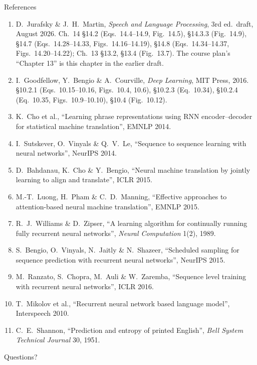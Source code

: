 \documentclass[aspectratio=169, 11pt]{beamer}
\newcommand{\nosrc}{}       %
\begin{document}
\begin{frame}[allowframebreaks]{References}
  \nosrc
  \vspace{0.3em}
  {\scriptsize
  \begin{enumerate}\itemsep0.30em
    \item D.\ Jurafsky \& J.\ H.\ Martin, \emph{Speech and Language
          Processing}, 3rd ed.\ draft, August 2026. Ch.~14 \S14.2
          (Eqs.~14.4--14.9, Fig.~14.5), \S14.3.3 (Fig.~14.9), \S14.7
          (Eqs.~14.28--14.33, Figs.~14.16--14.19), \S14.8
          (Eqs.~14.34--14.37, Figs.~14.20--14.22); Ch.~13 \S13.2, \S13.4
          (Fig.~13.7). The course plan's ``Chapter 13'' is this chapter
          in the earlier draft.
    \item I.\ Goodfellow, Y.\ Bengio \& A.\ Courville, \emph{Deep
          Learning}, MIT Press, 2016. \S10.2.1 (Eqs.~10.15--10.16,
          Figs.~10.4, 10.6), \S10.2.3 (Eq.~10.34), \S10.2.4 (Eq.~10.35,
          Figs.~10.9--10.10), \S10.4 (Fig.~10.12).
    \item K.\ Cho et al., ``Learning phrase representations using RNN
          encoder--decoder for statistical machine translation'',
          EMNLP 2014.
    \item I.\ Sutskever, O.\ Vinyals \& Q.\ V.\ Le, ``Sequence to sequence
          learning with neural networks'', NeurIPS 2014.
    \item D.\ Bahdanau, K.\ Cho \& Y.\ Bengio, ``Neural machine
          translation by jointly learning to align and translate'',
          ICLR 2015.
    \item M.-T.\ Luong, H.\ Pham \& C.\ D.\ Manning, ``Effective
          approaches to attention-based neural machine translation'',
          EMNLP 2015.
    \item R.\ J.\ Williams \& D.\ Zipser, ``A learning algorithm for
          continually running fully recurrent neural networks'',
          \emph{Neural Computation} 1(2), 1989.
    \item S.\ Bengio, O.\ Vinyals, N.\ Jaitly \& N.\ Shazeer, ``Scheduled
          sampling for sequence prediction with recurrent neural
          networks'', NeurIPS 2015.
    \item M.\ Ranzato, S.\ Chopra, M.\ Auli \& W.\ Zaremba, ``Sequence
          level training with recurrent neural networks'', ICLR 2016.
    \item T.\ Mikolov et al., ``Recurrent neural network based language
          model'', Interspeech 2010.
    \item C.\ E.\ Shannon, ``Prediction and entropy of printed English'',
          \emph{Bell System Technical Journal} 30, 1951.
  \end{enumerate}}
\end{frame}

\begin{frame}[standout]
  \nosrc
  Questions?
\end{frame}
\end{document}
